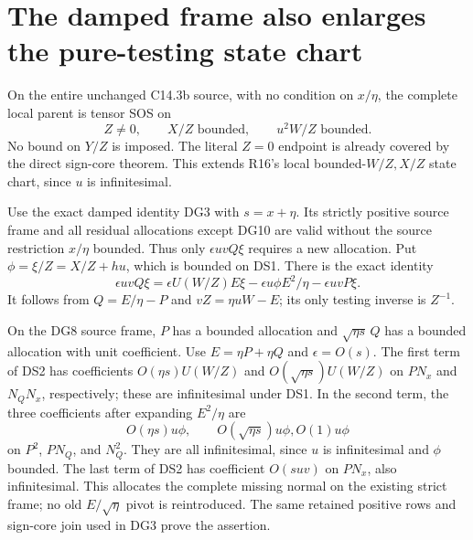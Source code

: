 \section{The damped frame also enlarges the pure-testing state chart}

\begin{proposition}
On the entire unchanged C14.3b source, with no condition on $x/\eta$,
the complete local parent is tensor SOS on
\[
 Z\ne0,\qquad X/Z\text{ bounded},\qquad
                         u^2W/Z\text{ bounded}.       \tag{DS1}
\]
No bound on $Y/Z$ is imposed. The literal $Z=0$ endpoint is already
covered by the direct sign-core theorem. This extends R16's local
bounded-$W/Z,X/Z$ state chart, since $u$ is infinitesimal.
\end{proposition}

Use the exact damped identity DG3 with $s=x+\eta$. Its strictly
positive source frame and all residual allocations except DG10 are
valid without the source restriction $x/\eta$ bounded. Thus only
$\epsilon uvQ\xi$ requires a new allocation. Put
$\phi=\xi/Z=X/Z+hu$, which is bounded on DS1. There is the exact
identity
\[
 \boxed{\quad
 \epsilon uvQ\xi
 =\epsilon U(W/Z)E\xi
       -\epsilon u\phi E^2/\eta-\epsilon uvP\xi.
 \quad}                                                   \tag{DS2}
\]
It follows from $Q=E/\eta-P$ and $vZ=\eta uW-E$; its only testing
inverse is $Z^{-1}$.

On the DG8 source frame, $P$ has a bounded allocation and
$\sqrt{\eta s}\,Q$ has a bounded allocation with unit coefficient.
Use $E=\eta P+\eta Q$ and $\epsilon=O(s)$. The first term of DS2
has coefficients $O(\eta s)U(W/Z)$ and
$O(\sqrt{\eta s})U(W/Z)$ on $PN_x$ and $N_QN_x$, respectively;
these are infinitesimal under DS1. In the second term, the three
coefficients after expanding $E^2/\eta$ are
\[
 O(\eta s)u\phi,\qquad O(\sqrt{\eta s})u\phi,
                                      O(1)u\phi
\]
on $P^2$, $PN_Q$, and $N_Q^2$. They are all infinitesimal, since
$u$ is infinitesimal and $\phi$ bounded. The last term of DS2 has
coefficient $O(suv)$ on $PN_x$, also infinitesimal. This allocates
the complete missing normal on the existing strict frame; no old
$E/\sqrt\eta$ pivot is reintroduced. The same retained positive
rows and sign-core join used in DG3 prove the assertion.


